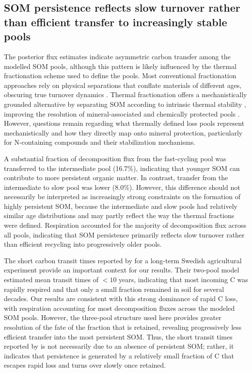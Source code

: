 \documentclass[bg, manuscript]{copernicus}
\begin{document}
\subsection{SOM persistence reflects slow turnover rather than efficient transfer to increasingly stable pools}
The posterior flux estimates indicate asymmetric carbon transfer among the modelled SOM pools, although this pattern is likely influenced by the thermal fractionation scheme used to define the pools. Most conventional fractionation approaches rely on physical separations that conflate materials of different ages, obscuring true turnover dynamics \citep{Castanha2008}. Thermal fractionation offers a mechanistically grounded alternative by separating SOM according to intrinsic thermal stability \citep{Fernandez2011}, improving the resolution of mineral-associated and chemically protected pools \citep{Sanderman2020, Stoner2023}. However, questions remain regarding what thermally defined loss pools represent mechanistically and how they directly map onto mineral protection, particularly for N-containing compounds and their stabilization mechanisms.

A substantial fraction of decomposition flux from the fast-cycling pool was transferred to the intermediate pool (16.7\%), indicating that younger SOM can contribute to more persistent organic matter. In contrast, transfer from the intermediate to slow pool was lower (8.0\%). However, this difference should not necessarily be interpreted as increasingly strong constraints on the formation of highly persistent SOM, because the intermediate and slow pools had relatively similar age distributions and may partly reflect the way the thermal fractions were defined. Respiration accounted for the majority of decomposition flux across all pools, indicating that SOM persistence primarily reflects slow turnover rather than efficient recycling into progressively older pools.

The short carbon transit times reported by \citet{Spohn2023} for a long-term Swedish agricultural experiment provide an important context for our results. Their two-pool model estimated mean transit times of $< 10$ years, indicating that most incoming C was rapidly respired and that only a small fraction remained in soil for several decades. Our results are consistent with this strong dominance of rapid C loss, with respiration accounting for most decomposition fluxes across the modeled SOM pools. However, the three-pool structure used here provides greater resolution of the fate of the fraction that is retained, revealing progressively less efficient transfer into the most persistent SOM. Thus, the short transit times reported by \citet{Spohn2023} is not necessarily due to an absence of persistent SOM; rather, it indicates that persistence is generated by a relatively small fraction of C that escapes rapid loss and turns over slowly once retained.
\end{document}
